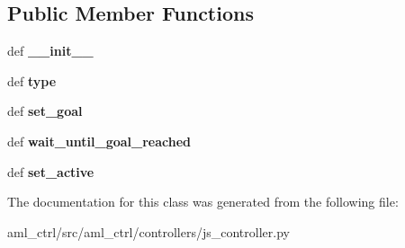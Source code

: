 \subsection*{Public Member Functions}
\begin{DoxyCompactItemize}
\item 
\hypertarget{classaml__ctrl_1_1controllers_1_1js__controller_1_1_j_s_controller_a1be5960e312e049110b8991d51210cfe}{def {\bfseries \-\_\-\-\_\-init\-\_\-\-\_\-}}\label{classaml__ctrl_1_1controllers_1_1js__controller_1_1_j_s_controller_a1be5960e312e049110b8991d51210cfe}

\item 
\hypertarget{classaml__ctrl_1_1controllers_1_1js__controller_1_1_j_s_controller_a79e68c4d8dacce86034685b456d73f35}{def {\bfseries type}}\label{classaml__ctrl_1_1controllers_1_1js__controller_1_1_j_s_controller_a79e68c4d8dacce86034685b456d73f35}

\item 
\hypertarget{classaml__ctrl_1_1controllers_1_1js__controller_1_1_j_s_controller_a6fc08eab26adc2e6b8203000c6354995}{def {\bfseries set\-\_\-goal}}\label{classaml__ctrl_1_1controllers_1_1js__controller_1_1_j_s_controller_a6fc08eab26adc2e6b8203000c6354995}

\item 
\hypertarget{classaml__ctrl_1_1controllers_1_1js__controller_1_1_j_s_controller_abe8dc6b50975e05b50c4f7ab2c2caf7c}{def {\bfseries wait\-\_\-until\-\_\-goal\-\_\-reached}}\label{classaml__ctrl_1_1controllers_1_1js__controller_1_1_j_s_controller_abe8dc6b50975e05b50c4f7ab2c2caf7c}

\item 
\hypertarget{classaml__ctrl_1_1controllers_1_1js__controller_1_1_j_s_controller_ab88464ee7d52df9accc043f7ec37d109}{def {\bfseries set\-\_\-active}}\label{classaml__ctrl_1_1controllers_1_1js__controller_1_1_j_s_controller_ab88464ee7d52df9accc043f7ec37d109}

\end{DoxyCompactItemize}


The documentation for this class was generated from the following file\-:\begin{DoxyCompactItemize}
\item 
aml\-\_\-ctrl/src/aml\-\_\-ctrl/controllers/js\-\_\-controller.\-py\end{DoxyCompactItemize}
